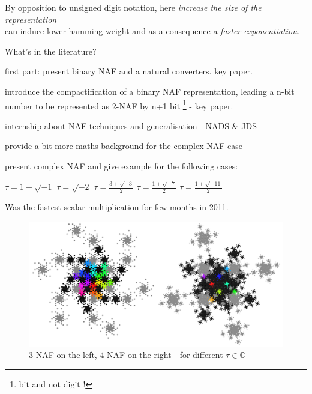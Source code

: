 \begin{center}			
	By opposition to unsigned digit notation, here 
	\textit{increase the size of the representation}\\ 
	can induce lower hamming weight and as a consequence a 
	\textit{faster exponentiation}.
\end{center}			

What's in the literature?
\cite{eurocrypt-1984-2410}

\cite{cciam-1997-joye} first part: present binary NAF and a natural converters. 
key paper.

\cite{pkc-2001-joye} introduce the compactification of a binary NAF representation,
leading a n-bit number to be represented as 2-NAF by n+1 bit \footnote{bit and not digit !} - key paper.

\cite{M2Thesis-Muir-2004} internship about NAF techniques and generalisation 
- NADS \& JDS- 

\cite{jofnt-2012-heuberger} provide a bit more  maths background for the complex NAF case


\cite{CanJMath-2008-blake} present complex NAF and give example for the following cases:
\begin{center}
$\tau =  1+\sqrt{-1}  $ \;\;
$\tau =  \sqrt{-2} $ \;\;
$\tau =  \frac{3+\sqrt{-3}}{2} $\;\;
$\tau =  \frac{1+\sqrt{-7}}{2} $\;\;
$\tau =  \frac{1+\sqrt{-11}}{2} $
\end{center}
\cite{latincrypt-2011-aranha} Was the fastest scalar multiplication for few months in 2011.






    \begin{figure}[!h]
        \centering
        \includegraphics[width=15cm]{images/dessin.png}
\caption{3-NAF on the left, 4-NAF on the right - for different $\tau \in \mathbb{C}$}
    \end{figure}


